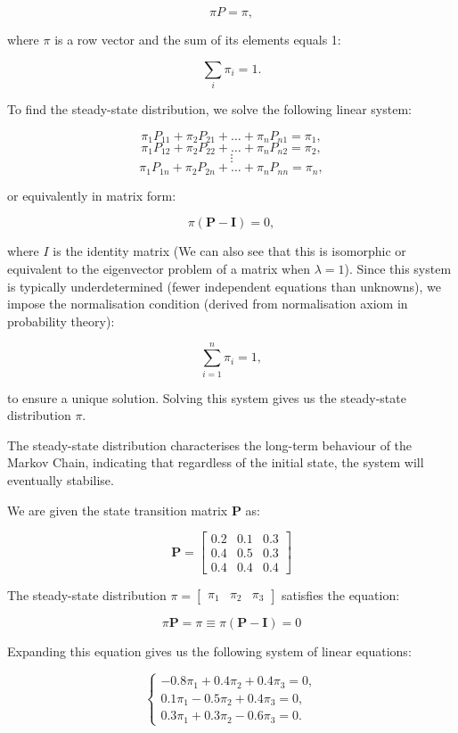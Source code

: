 \documentclass[12pt,a4paper]{article}
\begin{document}
\begin{remark}
    \[
    \pi P = \pi,
    \]

    where \(\pi\) is a row vector and the sum of its elements equals 1:

    \[
    \sum_{i} \pi_i = 1.
    \]

    To find the steady-state distribution, we solve the following linear system:

    \[
    \pi_1 P_{11} + \pi_2 P_{21} + \dots + \pi_n P_{n1} = \pi_1,
    \]
    \[
    \pi_1 P_{12} + \pi_2 P_{22} + \dots + \pi_n P_{n2} = \pi_2,
    \]
    \[
    \vdots
    \]
    \[
    \pi_1 P_{1n} + \pi_2 P_{2n} + \dots + \pi_n P_{nn} = \pi_n,
    \]

    or equivalently in matrix form:

    \[
    \pi (\mathbf{P} - \mathbf{I}) = 0,
    \]

    where \( I \) is the identity matrix (We can also see that this is isomorphic or equivalent to the eigenvector problem of a matrix when $\lambda=1$). Since this system is typically underdetermined (fewer independent equations than unknowns), we impose the normalisation condition (derived from normalisation axiom in probability theory):

    \[
    \sum_{i=1}^n \pi_i = 1,
    \]

    to ensure a unique solution. Solving this system gives us the steady-state distribution \(\pi\).

    The steady-state distribution characterises the long-term behaviour of the Markov Chain, indicating that regardless of the initial state, the system will eventually stabilise.

We are given the state transition matrix \( \mathbf{P} \) as:

\[
\mathbf{P} = \begin{bmatrix}
0.2 & 0.1 & 0.3 \\
0.4 & 0.5 & 0.3 \\
0.4 & 0.4 & 0.4
\end{bmatrix}
\]

The steady-state distribution \( \pi = \begin{bmatrix} \pi_1 & \pi_2 & \pi_3 \end{bmatrix} \) satisfies the equation:

\[
\pi \mathbf{P} = \pi \equiv \pi (\mathbf{P} - \mathbf{I})=0
\]

Expanding this equation gives us the following system of linear equations:

\[
\begin{cases}
-0.8\pi_1 + 0.4\pi_2 + 0.4\pi_3 = 0, \\
0.1\pi_1 - 0.5\pi_2 + 0.4\pi_3 = 0, \\
0.3\pi_1 + 0.3\pi_2 - 0.6\pi_3 = 0.
\end{cases}
\]


\end{remark}
\end{document}
